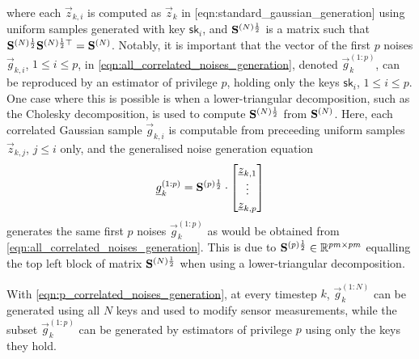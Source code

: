 where each $\vec{z}_{k,i}$ is computed as $\vec{z}_k$ in [eqn:standard\_gaussian\_generation] using uniform samples generated with key $\mathsf{sk}_i$, and ${{\mathbf{S}}}^{(N)\frac{1}{2}}$ is a matrix such that ${{\mathbf{S}}}^{(N)\frac{1}{2}}{{\mathbf{S}}}^{(N)\frac{1}{2}\top}={{\mathbf{S}}}^{(N)}$. Notably, it is important that the vector of the first $p$ noises $\vec{g}_{k,i}$, $1\leq i \leq p$, in \eqref{eqn:all_correlated_noises_generation}, denoted $\vec{g}_k^{(1:p)}$, can be reproduced by an estimator of privilege $p$, holding only the keys $\mathsf{sk}_i$, $1\leq i \leq p$. One case where this is possible is when a lower-triangular decomposition, such as the Cholesky decomposition, is used to compute ${{\mathbf{S}}}^{(N)\frac{1}{2}}$ from ${{\mathbf{S}}}^{(N)}$. Here, each correlated Gaussian sample $\vec{g}_{k,i}$ is computable from preceeding uniform samples $\vec{z}_{k,j}$, $j\leq i$ only, and the generalised noise generation equation
\begin{equation}\label{eqn:p_correlated_noises_generation}
  {\underline{g}}_k^{(1:p)}=
  {{\mathbf{S}}}^{(p)\frac{1}{2}}\cdot
  \begin{bmatrix}
    {\underline{z}}_{k,1}\\
    \vdots\\
    {\underline{z}}_{k,p}
  \end{bmatrix}
\end{equation}
generates the same first $p$ noises $\vec{g}_k^{(1:p)}$ as would be obtained from \eqref{eqn:all_correlated_noises_generation}. This is due to ${{\mathbf{S}}}^{(p)\frac{1}{2}}\in\mathbb{R}^{pm\times pm}$ equalling the top left block of matrix ${{\mathbf{S}}}^{(N)\frac{1}{2}}$ when using a lower-triangular decomposition.

With \eqref{eqn:p_correlated_noises_generation}, at every timestep $k$, $\vec{g}_k^{(1:N)}$ can be generated using all $N$ keys and used to modify sensor measurements, while the subset $\vec{g}_k^{(1:p)}$ can be generated by estimators of privilege $p$ using only the keys they hold.

% 
% 

